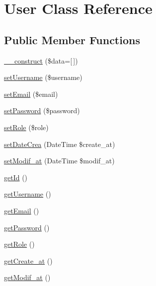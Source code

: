 \hypertarget{class_src_1_1_entity_1_1_user}{}\section{User Class Reference}
\label{class_src_1_1_entity_1_1_user}
\subsection*{Public Member Functions}
\begin{DoxyCompactItemize}
\item 
\hyperlink{class_src_1_1_entity_1_1_user_ab3129f1d71e9f51353de9d551ea381d7}{\+\_\+\+\_\+construct} (\$data=\mbox{[}$\,$\mbox{]})
\item 
\hyperlink{class_src_1_1_entity_1_1_user_ac359b701a2ccaff746dd480f03314244}{set\+Username} (\$username)
\item 
\hyperlink{class_src_1_1_entity_1_1_user_a5ef76eef42d2624386442eeb636d338c}{set\+Email} (\$email)
\item 
\hyperlink{class_src_1_1_entity_1_1_user_a3e35c8d3dbb2c513c618a664389e0926}{set\+Password} (\$password)
\item 
\hyperlink{class_src_1_1_entity_1_1_user_aa9233284be00bee150c4982e73785b72}{set\+Role} (\$role)
\item 
\hyperlink{class_src_1_1_entity_1_1_user_a9c8311c6d2e7d1d118a6a6da7b577c0b}{set\+Date\+Crea} (Date\+Time \$create\+\_\+at)
\item 
\hyperlink{class_src_1_1_entity_1_1_user_a9f9f5983de6ae197176a80f55f113a6c}{set\+Modif\+\_\+at} (Date\+Time \$modif\+\_\+at)
\item 
\hyperlink{class_src_1_1_entity_1_1_user_a12251d0c022e9e21c137a105ff683f13}{get\+Id} ()
\item 
\hyperlink{class_src_1_1_entity_1_1_user_a81b37a3c9d639574e394f80c1138c75e}{get\+Username} ()
\item 
\hyperlink{class_src_1_1_entity_1_1_user_a02a01849f28e2535e888ae4ec87b20f2}{get\+Email} ()
\item 
\hyperlink{class_src_1_1_entity_1_1_user_a04e0957baeb7acde9c0c86556da2d43f}{get\+Password} ()
\item 
\hyperlink{class_src_1_1_entity_1_1_user_a0b2e7098f1c48a7439a42bada5b69689}{get\+Role} ()
\item 
\hyperlink{class_src_1_1_entity_1_1_user_ae5e6c0bedcef3f514100c20ee92c901a}{get\+Create\+\_\+at} ()
\item 
\hyperlink{class_src_1_1_entity_1_1_user_a5858386cc69be9863ed37e0ceb2697b1}{get\+Modif\+\_\+at} ()
\end{DoxyCompactItemize}


